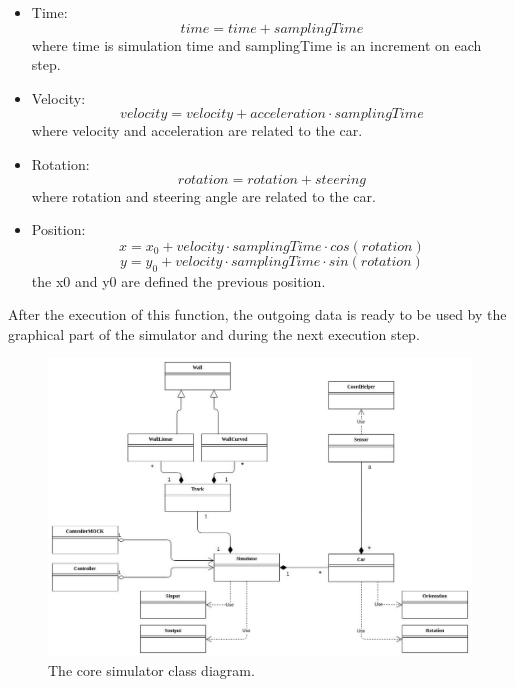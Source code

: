 \begin{itemize}
    \item Time:
        \begin{equation}
            time = time + samplingTime
        \end{equation} \newline
        where time is simulation time and samplingTime is an increment on each step. 
    \item Velocity:
    \begin{equation}
        velocity = velocity + acceleration \cdot samplingTime
    \end{equation} \newline
        where velocity and acceleration are related to the car.
    \item Rotation:
    \begin{equation}
        rotation = rotation + steering
    \end{equation} \newline
        where rotation and steering angle are related to the car.
    \item Position:
    \begin{equation}
        x = x_0 + velocity \cdot samplingTime \cdot cos(rotation)
    \end{equation}
    \begin{equation}
        y = y_0 + velocity \cdot samplingTime \cdot sin(rotation)
    \end{equation} \newline
    the x0 and y0 are defined the previous position.
\end{itemize}
After the execution of this function, the outgoing data is ready to be used by the graphical part of the simulator and during the next execution step. \newline
\begin{figure}[h!]
    \centering
    \includegraphics[width=\linewidth]{src/pic/class-diagram}
    \caption{The core simulator class diagram.}
    \label{fig:class-diagram}
\end{figure}
